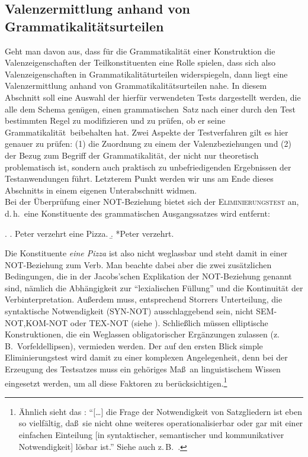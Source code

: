 \subsection{Valenzermittlung anhand von Grammatikalitäts\-ur\-teilen} \label{sec-valenzermittlung-sprecherbefragung}

Geht man davon aus, dass für die Grammatikalität einer Konstruktion die Valenz\-eigenschaften der Teilkonstituenten eine Rolle spielen, dass sich also Valenzeigenschaften in Grammatikalitäturteilen widerspiegeln, dann liegt eine Valenzermittlung anhand von Grammatikalitätsurteilen nahe. In diesem Abschnitt soll eine Auswahl der hierfür verwendeten Tests dargestellt werden, die alle dem Schema genügen, einen \glq grammatischen\grq\ Satz nach einer durch den Test bestimmten Regel zu modifizieren und zu prüfen, ob er seine \glq Grammatikalität\grq\ beibehalten hat. Zwei Aspekte der Testverfahren gilt es hier genauer zu prüfen: (1) die Zuordnung zu einem der Valenzbeziehungen und (2) der Bezug zum Begriff der Grammatikalität, der nicht nur theoretisch problematisch ist, sondern auch praktisch zu unbefriedigenden Ergebnissen der Testanwendungen führt. Letzterem Punkt werden wir uns am Ende dieses Abschnitts in einem eigenen Unterabschnitt widmen.\\

Bei der Überprüfung einer NOT-Beziehung bietet sich der \textsc{Eliminierungstest} an, d.\,h.\ eine Konstituente des grammatischen Ausgangssatzes wird entfernt:  

\ex. 
\a. Peter verzehrt eine Pizza.
\b. *Peter verzehrt.

Die Konstituente {\it eine Pizza} ist also nicht weglassbar und steht damit in einer NOT-Beziehung zum Verb. Man beachte dabei aber die zwei zusätzlichen Bedingungen, die in der Jacobs'schen Explikation der NOT-Beziehung genannt sind, nämlich die Abhängigkeit zur "`lexialischen Füllung"'  und die Kontinuität der Verb\-interpretation. Au\ss erdem muss, entsprechend Storrers Unterteilung, die syntaktische Notwendigkeit (SYN-NOT) ausschlaggebend sein, nicht SEM-NOT,\linebreak KOM-NOT oder TEX-NOT (siehe \citealt[105]{Storrer:92}). Schlie\ss lich müssen elliptische Konstruktionen, die ein Weglassen obligatorischer Ergänzungen zulassen (z.\,B.\ Vorfeldellipsen), vermieden werden. Der auf den ersten Blick simple Eliminierungstest wird damit zu einer komplexen Angelegenheit, denn bei der Erzeugung des Testsatzes muss ein gehöriges Ma\ss \ an linguistischem Wissen eingesetzt werden, um all diese Faktoren zu berücksichtigen.\footnote{Ähnlich sieht das \citet[36f]{Heringer:84}: "`[\ldots] die Frage der Notwendigkeit von Satzgliedern ist eben so vielfältig, da\ss \ sie nicht ohne weiteres operationalisierbar oder gar mit einer einfachen Einteilung [in syntaktischer, semantischer und kommunikativer Notwendigkeit] lösbar ist."' Siehe auch z.\,B.\ \citet[226]{Vater:81}.} \\

